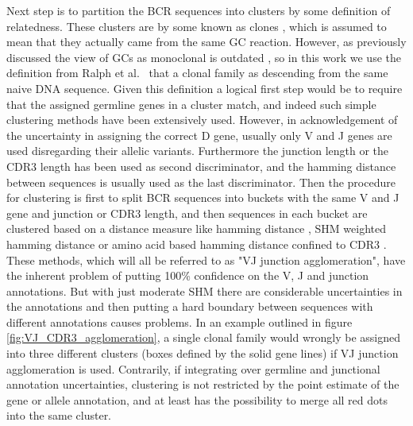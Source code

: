 Next step is to partition the BCR sequences into clusters by some definition of relatedness.
These clusters are by some known as clones \cite{gupta2017hierarchical}, which is assumed to mean that they actually came from the same GC reaction.
However, as previously discussed the view of GCs as monoclonal is outdated \cite{tas2016visualizing}, so in this work we use the definition from Ralph et al.\ \cite{ralph2016likelihood} that a clonal family as descending from the same naive DNA sequence.
Given this definition a logical first step would be to require that the assigned germline genes in a cluster match, and indeed such simple clustering methods have been extensively used.
However, in acknowledgement of the uncertainty in assigning the correct D gene, usually only V and J genes are used disregarding their allelic variants.
Furthermore the junction length or the CDR3 length has been used as second discriminator, and the hamming distance between sequences is usually used as the last discriminator.
Then the procedure for clustering is first to split BCR sequences into buckets with the same V and J gene and junction or CDR3 length, and then sequences in each bucket are clustered based on a distance measure like hamming distance \cite{glanville2011naive}, SHM weighted hamming distance \cite{gupta2017hierarchical} or amino acid based hamming distance confined to CDR3 \cite{jiang2013lineage}.
These methods, which will all be referred to as "VJ junction agglomeration", have the inherent problem of putting 100\% confidence on the V, J and junction annotations.
But with just moderate SHM there are considerable uncertainties in the annotations and then putting a hard boundary between sequences with different annotations causes problems.
In an example outlined in figure \ref{fig:VJ_CDR3_agglomeration}, a single clonal family would wrongly be assigned into three different clusters (boxes defined by the solid gene lines) if VJ junction agglomeration is used.
Contrarily, if integrating over germline and junctional annotation uncertainties, clustering is not restricted by the point estimate of the gene or allele annotation, and at least has the possibility to merge all red dots into the same cluster.

